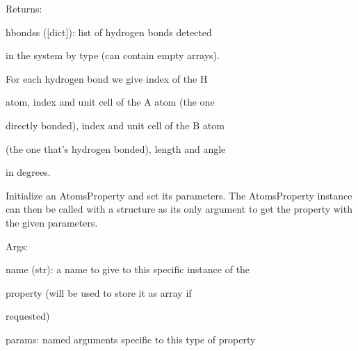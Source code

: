 \documentclass[letterpaper,10pt,english]{sphinxmanual}
\begin{document}
\begin{fulllineitems}
\begin{DUlineblock}{0em}
\item[] Returns:
\item[]
\begin{DUlineblock}{\DUlineblockindent}
\item[] hbondss ({[}dict{]}): list of hydrogen bonds detected
\item[]
\begin{DUlineblock}{\DUlineblockindent}
\item[] in the system by type (can contain empty arrays).
\item[] For each hydrogen bond we give index of the H
\item[] atom, index and unit cell of the A atom (the one
\item[] directly bonded), index and unit cell of the B atom
\item[] (the one that's hydrogen bonded), length and angle
\item[] in degrees.
\end{DUlineblock}
\end{DUlineblock}
\end{DUlineblock}

Initialize an AtomsProperty and set its parameters.
The AtomsProperty instance can then be called with a structure as its
only argument to get the property with the given parameters.

\begin{DUlineblock}{0em}
\item[] Args:
\item[]
\begin{DUlineblock}{\DUlineblockindent}
\item[] name (str): a name to give to this specific instance of the
\item[]
\begin{DUlineblock}{\DUlineblockindent}
\item[] property (will be used to store it as array if
\item[] requested)
\end{DUlineblock}
\item[] params: named arguments specific to this type of property
\end{DUlineblock}
\end{DUlineblock}

\begin{fulllineitems}
\label{doctree/soprano.properties.linkage.linkage:soprano.properties.linkage.linkage.HydrogenBonds.default_name}
\end{fulllineitems}


\end{fulllineitems}
\end{document}
